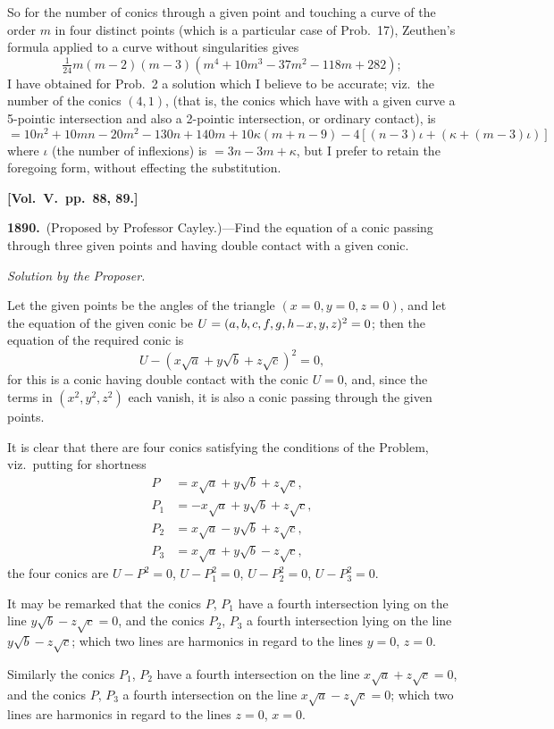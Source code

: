 \documentclass[11pt,a4paper]{article}
\theoremstyle{plain}
\theoremstyle{definition}
\theoremstyle{remark}
\begin{document}
So for the number of conics through a given point and touching a curve of the order $m$ in four distinct points (which is a particular case of Prob.\ 17), Zeuthen's formula applied to a curve without singularities gives
\[
\tfrac1{24}m(m-2)(m-3)(m^{4}+10m^{3}-37m^{2}-118m+282);
\]
I have obtained for Prob.\ 2 a solution which I believe to be accurate; viz.\ the number of the conics $(4,1)$, (that is, the conics which have with a given curve a 5-pointic intersection and also a 2-pointic intersection, or ordinary contact), is
\[
=10n^{2}+10mn-20m^{2}-130n+140m+10\kappa(m+n-9)-4[(n-3)\iota+(\kappa+(m-3)\iota)]
\]
where $\iota$ (the number of inflexions) is $=3n-3m+\kappa$, but I prefer to retain the foregoing form, without effecting the substitution.


\textbf{[Vol.\ V.\ pp.\ 88, 89.]}

\textbf{1890.}\ (Proposed by Professor Cayley.)---Find the equation of a conic passing through three given points and having double contact with a given conic.

\textit{Solution by the Proposer.}

Let the given points be the angles of the triangle $(x=0,y=0,z=0)$, and let the equation of the given conic be $U=(a,b,c,f,g,h\,\overline{\vrule width 6pt}\,x,y,z)^{2}=0$; then the equation of the required conic is
\[
U-(x\sqrt{a}+y\sqrt{b}+z\sqrt{c})^{2}=0,
\]
for this is a conic having double contact with the conic $U=0$, and, since the terms in $(x^{2},y^{2},z^{2})$ each vanish, it is also a conic passing through the given points.

It is clear that there are four conics satisfying the conditions of the Problem, viz.\ putting for shortness
\begin{align*}
P &= x\sqrt{a}+y\sqrt{b}+z\sqrt{c},\\
P_{1} &= -x\sqrt{a}+y\sqrt{b}+z\sqrt{c},\\
P_{2} &= x\sqrt{a}-y\sqrt{b}+z\sqrt{c},\\
P_{3} &= x\sqrt{a}+y\sqrt{b}-z\sqrt{c},
\end{align*}
the four conics are $U-P^{2}=0$, $U-P_{1}^{2}=0$, $U-P_{2}^{2}=0$, $U-P_{3}^{2}=0$.

It may be remarked that the conics $P$, $P_{1}$ have a fourth intersection lying on the line $y\sqrt{b}-z\sqrt{c}=0$, and the conics $P_{2}$, $P_{3}$ a fourth intersection lying on the line $y\sqrt{b}-z\sqrt{c}$; which two lines are harmonics in regard to the lines $y=0$, $z=0$.

Similarly the conics $P_{1}$, $P_{2}$ have a fourth intersection on the line $x\sqrt{a}+z\sqrt{c}=0$, and the conics $P$, $P_{3}$ a fourth intersection on the line $x\sqrt{a}-z\sqrt{c}=0$; which two lines are harmonics in regard to the lines $z=0$, $x=0$.
\end{document}
